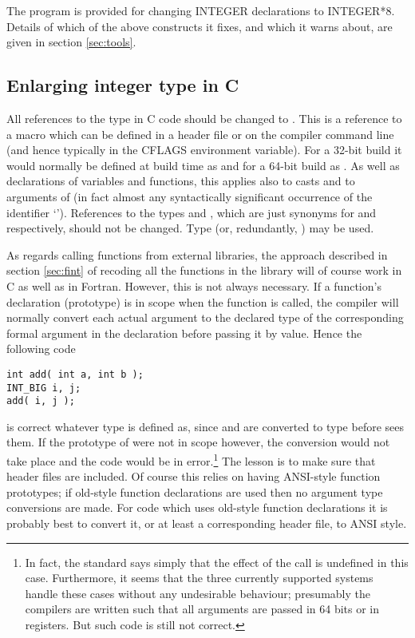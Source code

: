 \documentclass[twoside,11pt]{article}
\renewcommand{\_}{\texttt{\symbol{95}}}
\begin{document}
The program  is provided for changing 
INTEGER declarations to INTEGER*8.
Details of which of the above constructs it fixes, and which it
warns about, are given in section \ref{sec:tools}.


\subsection{Enlarging integer type in C\label{sec:cint}}

All references to the type  in C code should be changed to 
\cc{INT\_BIG}.  This is a reference to a macro which can be defined
in a header file or on the compiler command line 
(and hence typically in the CFLAGS  environment variable).  
For a 32-bit build it would normally be defined at build time as 
 and for a 64-bit build as .
As well as declarations of variables and functions, this applies also
to casts and to arguments of  (in fact almost any 
syntactically significant occurrence of the identifier `').
References to the types  and ,
which are just synonyms for  and  respectively,
should not be changed.  Type \cc{unsigned~INT\_BIG} 
(or, redundantly, \cc{signed~INT\_BIG}) may be used.

As regards calling functions from external libraries,
the approach described in section \ref{sec:fint} of 
recoding all the functions in the library will of course work in C
as well as in Fortran.
However, this is not always necessary.
If a function's declaration (prototype) is in scope when 
the function is called,
the compiler will normally 
convert each actual argument to the declared type of
the corresponding formal argument in the declaration 
before passing it by value.
Hence the following code
\begin{squote}
\begin{verbatim}
int add( int a, int b );
INT_BIG i, j;
add( i, j );
\end{verbatim}
\end{squote}
is correct whatever type \cc{INT\_BIG} is defined as, 
since  and  are converted to type 
before  sees them.
If the prototype of  were not in scope however,
the conversion would not take place and the code would be
in error.\footnote{
   In fact, the standard says simply that the effect of the call is
   undefined in this case.  Furthermore, it seems that the three
   currently supported systems handle these cases without
   any undesirable behaviour; presumably the compilers are written
   such that all arguments are passed in 64 bits or in registers.
   But such code is still not correct.
}
The lesson is to make sure that header files are
included.
Of course this relies on having ANSI-style function prototypes;
if old-style function declarations are used then no argument type
conversions are made.  For code which uses old-style function 
declarations it is probably best to convert it, 
or at least a corresponding header file, 
to ANSI style.
\end{document}
